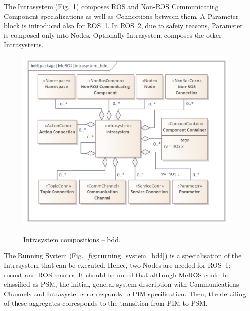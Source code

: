 \documentclass{ieeeaccess}
\begin{document}
	The Intrasystem (Fig.~\ref{fig:intrasystem_bdd}) composes ROS and Non-ROS Communicating Component specializations as well as Connections between them. A Parameter block is introduced also for ROS~1. In ROS~2, due to safety reasons, Parameter is composed only into Nodes. Optionally Intrasystem composes the other Intrasystems.
	
	\begin{figure}[htb]
		\centering
		\begin{center}
			{\includegraphics[scale=0.74]{img/meros_pkg/intrasystem_bdd.png}}
		\end{center}
		\caption{Intrasystem compositions -- bdd.} 
		\label{fig:intrasystem_bdd}
	\end{figure} 
	 
  	The Running System (Fig.~\ref{fig:running_system_bdd}) is a specialisation of the Intrasystem that can be executed. Hence, two Nodes are needed for ROS~1: rosout and ROS master. 
	It should be noted that although MeROS could be classified as PSM, the initial, general system description with Communications Channels and Intrasystems corresponds to PIM specification. Then, the detailing of these aggregates corresponds to the transition from PIM to PSM. 
	
\end{document}
